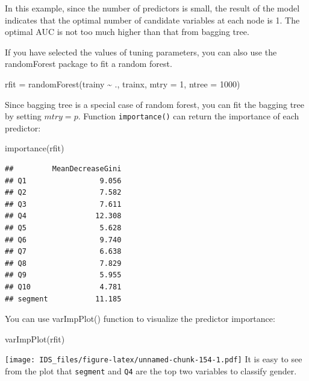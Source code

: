 \documentclass[
  12pt,
]{krantz}
\makeatletter
\newenvironment{Shaded}{\begin{snugshade}}{\end{snugshade}}
\newcommand{\AttributeTok}[1]{\textcolor[rgb]{0.61,0.61,0.61}{#1}}
\newcommand{\DecValTok}[1]{\textcolor[rgb]{0.06,0.06,0.06}{#1}}
\newcommand{\FunctionTok}[1]{\textcolor[rgb]{0,0,0}{#1}}
\newcommand{\NormalTok}[1]{#1}
\newcommand{\OtherTok}[1]{\textcolor[rgb]{0.37,0.37,0.37}{#1}}
\newcommand{\SpecialCharTok}[1]{\textcolor[rgb]{0,0,0}{#1}}
\newenvironment{kframe}{%
\medskip{}
\setlength{\fboxsep}{.8em}
 \def\at@end@of@kframe{}%
 \ifinner\ifhmode%
  \def\at@end@of@kframe{\end{minipage}}%
  \begin{minipage}{\columnwidth}%
 \fi\fi%
 \def\FrameCommand##1{\hskip\@totalleftmargin \hskip-\fboxsep
 \colorbox{shadecolor}{##1}\hskip-\fboxsep
     \hskip-\linewidth \hskip-\@totalleftmargin \hskip\columnwidth}%
 \MakeFramed {\advance\hsize-\width
   \@totalleftmargin\z@ \linewidth\hsize
   \@setminipage}}%
 {\par\unskip\endMakeFramed%
 \at@end@of@kframe}
\renewenvironment{Shaded}{\begin{kframe}}{\end{kframe}}
\makeatother
\begin{document}
In this example, since the number of predictors is small, the result of the model indicates that the optimal number of candidate variables at each node is 1. The optimal AUC is not too much higher than that from bagging tree.

If you have selected the values of tuning parameters, you can also use the randomForest package to fit a random forest.

\begin{Shaded}
\begin{Highlighting}[]
\NormalTok{rfit }\OtherTok{=} \FunctionTok{randomForest}\NormalTok{(trainy }\SpecialCharTok{\textasciitilde{}}\NormalTok{ ., trainx, }\AttributeTok{mtry =} \DecValTok{1}\NormalTok{, }\AttributeTok{ntree =} \DecValTok{1000}\NormalTok{)}
\end{Highlighting}
\end{Shaded}

Since bagging tree is a special case of random forest, you can fit the bagging tree by setting \(mtry=p\). Function \texttt{importance()} can return the importance of each predictor:

\begin{Shaded}
\begin{Highlighting}[]
\FunctionTok{importance}\NormalTok{(rfit)}
\end{Highlighting}
\end{Shaded}

\begin{verbatim}
##         MeanDecreaseGini
## Q1                 9.056
## Q2                 7.582
## Q3                 7.611
## Q4                12.308
## Q5                 5.628
## Q6                 9.740
## Q7                 6.638
## Q8                 7.829
## Q9                 5.955
## Q10                4.781
## segment           11.185
\end{verbatim}

You can use varImpPlot() function to visualize the predictor importance:

\begin{Shaded}
\begin{Highlighting}[]
\FunctionTok{varImpPlot}\NormalTok{(rfit)}
\end{Highlighting}
\end{Shaded}

\texttt{[image: IDS\_files/figure-latex/unnamed-chunk-154-1.pdf]}
It is easy to see from the plot that \texttt{segment} and \texttt{Q4} are the top two variables to classify gender.
\end{document}
